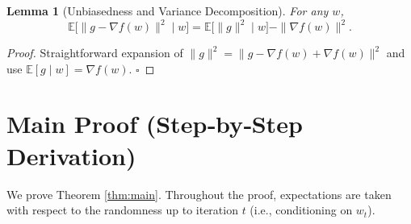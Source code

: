 \documentclass[11pt]{article}
\newtheorem{lemma}{Lemma}
\begin{document}
\begin{lemma}[Unbiasedness and Variance Decomposition]\label{lem:variance}
For any $w$,
\[
\mathbb{E}\big[\|g-\nabla f(w)\|^2\mid w\big]=\mathbb{E}\big[\|g\|^2\mid w\big]-\|\nabla f(w)\|^2 .
\]
\end{lemma}
\begin{proof}
Straightforward expansion of $\|g\|^2=\|g-\nabla f(w)+\nabla f(w)\|^2$ and use $\mathbb{E}[g\mid w]=\nabla f(w)$. \hfill $\square$
\end{proof}

\section*{Main Proof (Step‑by‑Step Derivation)}
We prove Theorem \ref{thm:main}. Throughout the proof, expectations are taken with respect to the randomness up to iteration $t$ (i.e., conditioning on $w_t$).
\end{document}
